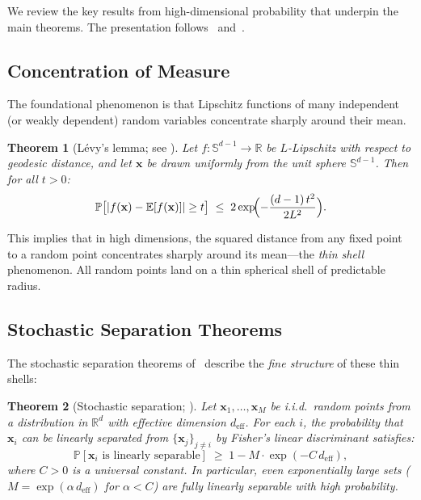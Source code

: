\documentclass[11pt,a4paper]{article}
\theoremstyle{plain}
\newtheorem{theorem}{Theorem}[section]
\theoremstyle{definition}
\theoremstyle{remark}
\newcommand{\R}{\mathbb{R}}
\newcommand{\E}{\mathbb{E}}
\newcommand{\Prob}{\mathbb{P}}
\newcommand{\deff}{d_{\mathrm{eff}}}
\newcommand{\abs}[1]{| #1 |}
\begin{document}
We review the key results from high-dimensional probability that underpin the
main theorems.  The presentation follows~\citet{gorban2018blessing}
and~\citet{vershynin2018high}.

\subsection{Concentration of Measure}\label{sec:concentration}

The foundational phenomenon is that Lipschitz functions of many independent (or
weakly dependent) random variables concentrate sharply around their mean.

\begin{theorem}[Lévy's lemma; see {\citealt[Ch.~5]{vershynin2018high}}]%
\label{thm:levy}
Let $f : \mathbb{S}^{d-1} \to \R$ be $L$-Lipschitz with respect to geodesic
distance, and let $\mathbf{x}$ be drawn uniformly from the unit sphere
$\mathbb{S}^{d-1}$.  Then for all $t > 0$:
\begin{equation}\label{eq:levy}
  \Prob\bigl[\abs{f(\mathbf{x}) - \E[f(\mathbf{x})]} \geq t\bigr]
  \;\leq\; 2\exp\!\Bigl(-\frac{(d-1)\,t^2}{2L^2}\Bigr).
\end{equation}
\end{theorem}

This implies that in high dimensions, the squared distance from any fixed point
to a random point concentrates sharply around its mean---the \emph{thin shell}
phenomenon.  All random points land on a thin spherical shell of predictable
radius.

\subsection{Stochastic Separation Theorems}\label{sec:separation}

The stochastic separation theorems of~\citet{gorban2018blessing} describe the
\emph{fine structure} of these thin shells:

\begin{theorem}[Stochastic separation; {\citealt[Thm.~1]{gorban2018blessing}}]%
\label{thm:stochastic-sep}
Let $\mathbf{x}_1, \ldots, \mathbf{x}_M$ be i.i.d.\ random points from a
distribution in $\R^d$ with effective dimension $\deff$.  For each $i$, the
probability that $\mathbf{x}_i$ can be linearly separated from
$\{\mathbf{x}_j\}_{j \neq i}$ by Fisher's linear discriminant satisfies:
\begin{equation}\label{eq:sep}
  \Prob[\text{$\mathbf{x}_i$ is linearly separable}]
  \;\geq\; 1 - M \cdot \exp(-C\,\deff),
\end{equation}
where $C > 0$ is a universal constant.  In particular, even exponentially large
sets ($M = \exp(\alpha\, \deff)$ for $\alpha < C$) are fully linearly separable
with high probability.
\end{theorem}
\end{document}
